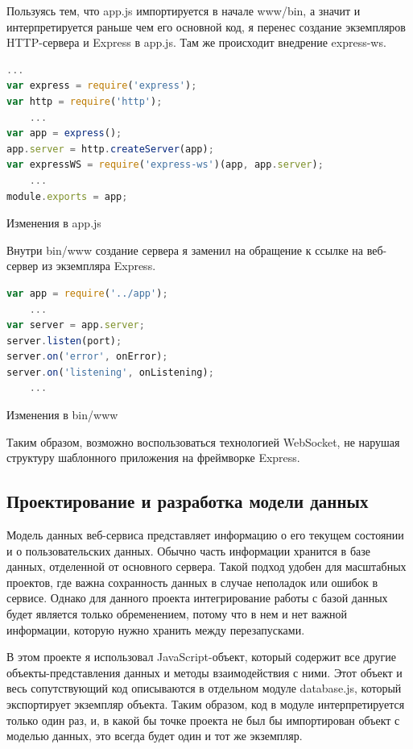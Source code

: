 Пользуясь тем, что app.js импортируется в начале www/bin, а значит и интерпретируется раньше чем его основной код, я перенес создание экземпляров HTTP-сервера и Express в app.js. Там же происходит внедрение express-ws.
\begin{ListingEnv}[H]
\begin{lstlisting}[language=JavaScript]
	...
var express = require('express');
var http = require('http');
	...
var app = express();
app.server = http.createServer(app); 
var expressWS = require('express-ws')(app, app.server);
	...
module.exports = app;
\end{lstlisting}
\caption{Изменения в app.js}
\label{list:appjs-ws}
\end{ListingEnv}  
Внутри bin/www создание сервера я заменил на обращение к ссылке на веб-сервер из экземпляра Express.
\begin{ListingEnv}[H]
\begin{lstlisting}[language=JavaScript]
var app = require('../app');
	...
var server = app.server;
server.listen(port);
server.on('error', onError);
server.on('listening', onListening);
	...
\end{lstlisting}
\caption{Изменения в bin/www}
\label{list:www-ws}
\end{ListingEnv}
Таким образом, возможно воспользоваться технологией WebSocket, не нарушая структуру шаблонного приложения на фреймворке Express. 

\subsection{Проектирование и разработка модели данных}
Модель данных веб-сервиса представляет информацию о его текущем состоянии и о пользовательских данных. Обычно часть информации хранится в базе данных, отделенной от основного сервера. Такой подход удобен для масштабных проектов, где важна сохранность данных в случае неполадок или ошибок в сервисе. Однако для данного проекта интегрирование работы с базой данных будет является только обременением, потому что в нем и нет важной информации, которую нужно хранить между перезапусками.

В этом проекте я использовал JavaScript-объект, который содержит все другие объекты-представления данных и методы взаимодействия с ними. Этот объект и весь сопутствующий код описываются в отдельном модуле database.js, который экспортирует экземпляр объекта. Таким образом, код в модуле интерпретируется только один раз, и, в какой бы точке проекта не был бы импортирован объект с моделью данных, это всегда будет один и тот же экземпляр.

